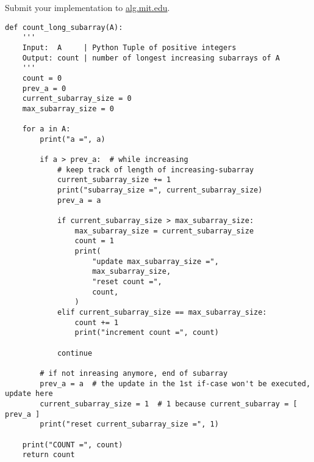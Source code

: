 \documentclass[12pt,twoside]{article}
\begin{document}
\begin{problems}
  



\vfill
\problem  %
Submit your implementation to {\small\url{alg.mit.edu}}.

\begin{lstlisting}
def count_long_subarray(A):
    '''
    Input:  A     | Python Tuple of positive integers
    Output: count | number of longest increasing subarrays of A
    '''
    count = 0
    prev_a = 0
    current_subarray_size = 0
    max_subarray_size = 0

    for a in A:
        print("a =", a)

        if a > prev_a:  # while increasing
            # keep track of length of increasing-subarray
            current_subarray_size += 1
            print("subarray_size =", current_subarray_size)
            prev_a = a

            if current_subarray_size > max_subarray_size:
                max_subarray_size = current_subarray_size
                count = 1
                print(
                    "update max_subarray_size =",
                    max_subarray_size,
                    "reset count =",
                    count,
                )
            elif current_subarray_size == max_subarray_size:
                count += 1
                print("increment count =", count)

            continue

        # if not inreasing anymore, end of subarray
        prev_a = a  # the update in the 1st if-case won't be executed, update here
        current_subarray_size = 1  # 1 because current_subarray = [ prev_a ]
        print("reset current_subarray_size =", 1)

    print("COUNT =", count)
    return count
\end{lstlisting}

\end{problems}
\end{document}
